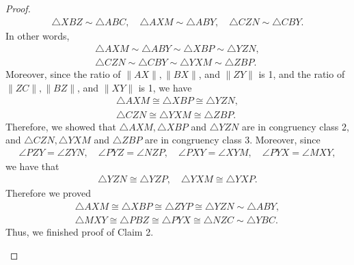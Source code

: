 \begin{proof}
    \begin{align*}
    \triangle{XBZ}\sim\triangle{ABC},
    \quad
    \triangle{AXM}\sim\triangle{ABY},
    \quad
    \triangle{CZN}\sim\triangle{CBY}.
    \end{align*}
    In other words, 
    \begin{align*}
    \triangle{AXM}\sim\triangle{ABY}\sim\triangle{XBP}\sim\triangle{YZN},\\
    \triangle{CZN}\sim\triangle{CBY}\sim\triangle{YXM}\sim\triangle{ZBP}.
    \end{align*}
    Moreover, since the ratio of $\|AX\|, \|BX\|$, and $\|ZY\|$ is 1, and the ratio of $\|ZC\|, \|BZ\|$, and $\|XY\|$ is 1, we have
    \begin{align*}
    \triangle{AXM}\cong\triangle{XBP}\cong\triangle{YZN},\\
    \triangle{CZN}\cong\triangle{YXM}\cong\triangle{ZBP}.
    \end{align*}
    Therefore, we showed that $\triangle{AXM}, \triangle{XBP}$ and $\triangle{YZN}$ are in congruency class 2, and $\triangle{CZN}, \triangle{YXM}$ and $\triangle{ZBP}$ are in congruency class 3.
    Moreover, since 
    \begin{align*}
    \angle{PZY} = \angle{ZYN},
    \quad
    \angle{PYZ} = \angle{NZP},
    \quad
    \angle{PXY} = \angle{XYM},
    \quad
    \angle{PYX} = \angle{MXY},
    \end{align*}
    we have that
    \begin{align*}
    \triangle{YZN}\cong\triangle{YZP},
    \quad
    \triangle{YXM}\cong\triangle{YXP}.
    \end{align*}
    Therefore we proved 
    \begin{align*}
    \triangle{AXM}\cong\triangle{XBP}\cong\triangle{ZYP}\cong\triangle{YZN}\sim\triangle{ABY},\\
    \triangle{MXY}\cong\triangle{PBZ}\cong\triangle{PYX}\cong\triangle{NZC}\sim\triangle{YBC}.
    \end{align*}
    Thus, we finished proof of Claim 2.
    
    \begin{figure}[h!]
    \centering
    \captionsetup{justification=centering}
\end{figure}
\end{proof}
